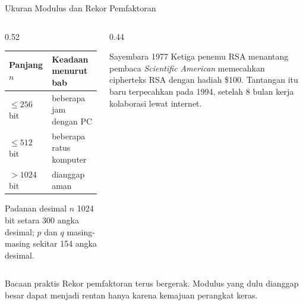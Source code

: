 \documentclass[aspectratio=169,11pt]{beamer}
\begin{document}
\begin{frame}{Ukuran Modulus dan Rekor Pemfaktoran}
    \footnotesize
    \begin{columns}[T,onlytextwidth]
        \begin{column}{0.52\textwidth}
            \begin{tabular}{@{}l l@{}}
                \toprule
                \textbf{Panjang $n$} & \textbf{Keadaan menurut bab} \\
                \midrule
                $\le 256$ bit & beberapa jam dengan PC \\
                $\le 512$ bit & beberapa ratus komputer \\
                $> 1024$ bit & dianggap aman \\
                \bottomrule
            \end{tabular}
            \vspace{0.1cm}
            \begin{block}{Padanan desimal}
                $n$ 1024 bit setara 300 angka desimal; $p$ dan $q$
                masing-masing sekitar 154 angka desimal.
            \end{block}
        \end{column}
        \begin{column}{0.44\textwidth}
            \begin{exampleblock}{Sayembara 1977}
                \footnotesize
                Ketiga penemu RSA menantang pembaca \textit{Scientific
                American} memecahkan cipherteks RSA dengan hadiah \$100.
                Tantangan itu baru terpecahkan pada 1994, setelah 8 bulan
                kerja kolaborasi lewat internet.
            \end{exampleblock}
        \end{column}
    \end{columns}
    \vspace{0.1cm}
    \begin{alertblock}{Bacaan praktis}
        \footnotesize
        Rekor pemfaktoran terus bergerak. Modulus yang dulu dianggap besar
        dapat menjadi rentan hanya karena kemajuan perangkat keras.
    \end{alertblock}
\end{frame}
\end{document}
